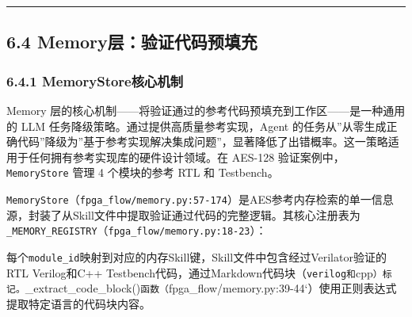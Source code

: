 \begin{center}\rule{0.5\linewidth}{0.5pt}\end{center}

\subsection{6.4
Memory层：验证代码预填充}\label{memoryux5c42ux9a8cux8bc1ux4ee3ux7801ux9884ux586bux5145}

\subsubsection{6.4.1
MemoryStore核心机制}\label{memorystoreux6838ux5fc3ux673aux5236}

Memory
层的核心机制------将验证通过的参考代码预填充到工作区------是一种通用的
LLM 任务降级策略。通过提供高质量参考实现，Agent
的任务从''从零生成正确代码''降级为''基于参考实现解决集成问题''，显著降低了出错概率。这一策略适用于任何拥有参考实现库的硬件设计领域。在
AES-128 验证案例中，\texttt{MemoryStore} 管理 4 个模块的参考 RTL 和
Testbench。

\texttt{MemoryStore}（\texttt{fpga\_flow/memory.py:57-174}）是AES参考内存检索的单一信息源，封装了从Skill文件中提取验证通过代码的完整逻辑。其核心注册表为\texttt{\_MEMORY\_REGISTRY}（\texttt{fpga\_flow/memory.py:18-23}）：

\begin{Shaded}
\begin{Highlighting}[]
\NormalTok{[}\NormalTok{, }\NormalTok{] }\OperatorTok{=}\NormalTok{ \{}
    \NormalTok{: }\NormalTok{,}
    \NormalTok{: }\NormalTok{,}
    \NormalTok{: }\NormalTok{,}
    \NormalTok{: }\NormalTok{,}
\NormalTok{\}}
\end{Highlighting}
\end{Shaded}

每个\texttt{module\_id}映射到对应的内存Skill键，Skill文件中包含经过Verilator验证的RTL
Verilog和C++
Testbench代码，通过Markdown代码块（\texttt{verilog\textasciigrave{}和}cpp\texttt{）标记。}\_extract\_code\_block()\texttt{函数（}fpga\_flow/memory.py:39-44`）使用正则表达式提取特定语言的代码块内容。

